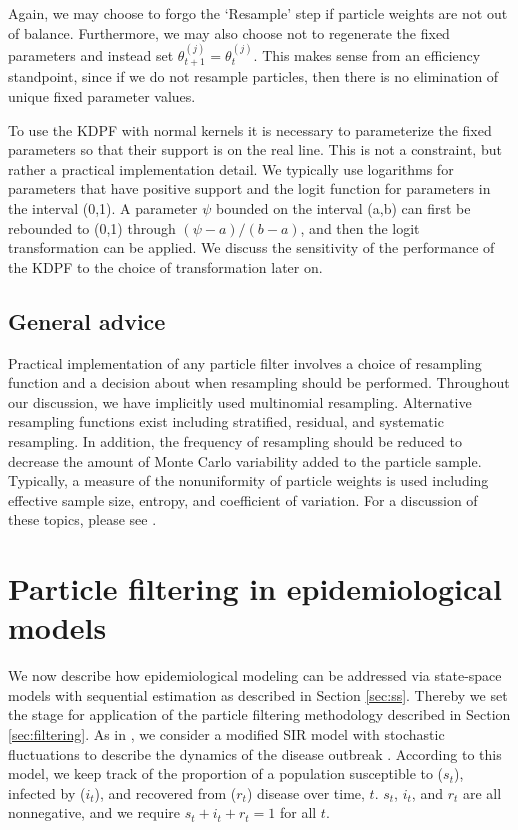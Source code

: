 \documentclass{elsarticle}
\begin{document}
\noindent Again, we may choose to forgo the `Resample' step if particle weights are not out of balance. Furthermore, we may also choose not to regenerate the fixed parameters and instead set $\theta_{t+1}^{(j)} = \theta_t^{(j)}$. This makes sense from an efficiency standpoint, since if we do not resample particles, then there is no elimination of unique fixed parameter values.

To use the KDPF with normal kernels it is necessary to parameterize the fixed parameters so that their support is on the real line. This is not a constraint, but rather a practical implementation detail. We typically use logarithms for parameters that have positive support and the logit function for parameters in the interval (0,1). A parameter $\psi$ bounded on the interval (a,b) can first be rebounded to (0,1) through $(\psi-a)/(b-a)$, and then the logit transformation can be applied. We discuss the sensitivity of the performance of the KDPF to the choice of transformation later on.

\subsection{General advice \label{sec:advice}}

Practical implementation of any particle filter involves a choice of resampling function and a decision about when resampling should be performed. Throughout our discussion, we have implicitly used multinomial resampling. Alternative resampling functions exist including stratified, residual, and systematic resampling. In addition, the frequency of resampling should be reduced to decrease the amount of Monte Carlo variability added to the particle sample. Typically, a measure of the nonuniformity of particle weights is used including effective sample size, entropy, and coefficient of variation. For a discussion of these topics, please see \cite{Douc:Capp:Moul:comp:2005}.

\section{Particle filtering in epidemiological models \label{sec:apply}}

We now describe how epidemiological modeling can be addressed via state-space models with sequential estimation as described in Section \ref{sec:ss}. Thereby we set the stage for application of the particle filtering methodology described in Section \ref{sec:filtering}. As in \citet{skvortsov2012monitoring}, we consider a modified SIR model with stochastic fluctuations to describe the dynamics of the disease outbreak \citep{herwaarden1995stochepid, dangerfield2009stochepid, anderson2004sars}. According to this model, we keep track of the proportion of a population susceptible to ($s_t$), infected by ($i_t$), and recovered from ($r_t$) disease over time, $t$. $s_t$, $i_t$, and $r_t$ are all nonnegative, and we require $s_t + i_t + r_t = 1$ for all $t$.
\end{document}
